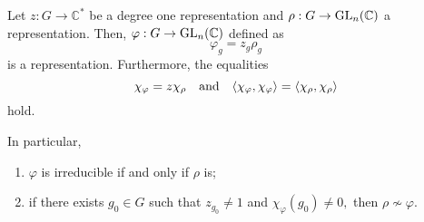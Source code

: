 \begin{cor} \label{cor:multiplyingdegonerep}
	Let $z : G \to \mathbb{C}^*$ be a degree one representation and $\rho : G \to \operatorname{GL}_n(\mathbb{C})$ a representation. Then, $\varphi : G \to \operatorname{GL}_n(\mathbb{C})$ defined as
	\begin{equation*} 
		\varphi_g = z_g \rho_g
	\end{equation*}
	is a representation. Furthermore, the equalities
	\begin{equation*} 
		\chi_\varphi = z \chi_\rho \quad\text{and}\quad \langle \chi_\varphi, \chi_\varphi\rangle = \langle \chi_\rho, \chi_\rho\rangle
	\end{equation*}
	hold.

	In particular,
	\begin{enumerate}
		\item $\varphi$ is irreducible if and only if $\rho$ is;
		\item if there exists $g_0 \in G$ such that $z_{g_0} \neq 1$ and $\chi_\varphi(g_0) \neq 0,$ then $\rho \not\sim \varphi.$
	\end{enumerate} 
\end{cor}

